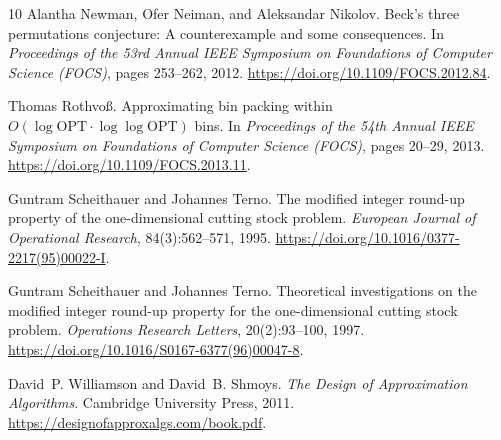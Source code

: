 \begin{thebibliography}{10}
Alantha Newman, Ofer Neiman, and Aleksandar Nikolov.
Beck's three permutations conjecture: A counterexample and some consequences.
In \emph{Proceedings of the 53rd Annual IEEE Symposium on Foundations of
Computer Science (FOCS)}, pages 253--262, 2012.
\url{https://doi.org/10.1109/FOCS.2012.84}.

Thomas Rothvo\ss.
Approximating bin packing within $O(\log\mathrm{OPT}\cdot
\log\log\mathrm{OPT})$ bins.
In \emph{Proceedings of the 54th Annual IEEE Symposium on Foundations of
Computer Science (FOCS)}, pages 20--29, 2013.
\url{https://doi.org/10.1109/FOCS.2013.11}.

Guntram Scheithauer and Johannes Terno.
The modified integer round-up property of the one-dimensional cutting stock problem.
\emph{European Journal of Operational Research}, 84(3):562--571, 1995.
\url{https://doi.org/10.1016/0377-2217(95)00022-I}.

Guntram Scheithauer and Johannes Terno.
Theoretical investigations on the modified integer round-up property
for the one-dimensional cutting stock problem.
\emph{Operations Research Letters}, 20(2):93--100, 1997.
\url{https://doi.org/10.1016/S0167-6377(96)00047-8}.

David~P. Williamson and David~B. Shmoys.
\emph{The Design of Approximation Algorithms}.
Cambridge University Press, 2011.
\url{https://designofapproxalgs.com/book.pdf}.

\end{thebibliography}
